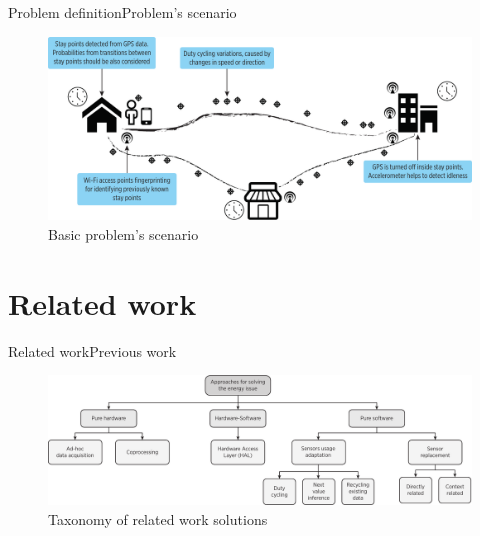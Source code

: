 \documentclass[10pt,xcolor={dvipsnames}]{beamer}
\begin{document}
\begin{frame}{Problem definition}{Problem's scenario}
\begin{figure}
  \centering
  \includegraphics[width=\textwidth]{vectors/scenario}
  \caption{Basic problem's scenario}
  \label{fig:scenario}
\end{figure}
\end{frame}

\section{Related work}
\begin{frame}{Related work}{Previous work}
\begin{figure}
  \centering
  \includegraphics[width=\textwidth]{../../../resources/images/vectors/approaches-taxonomy}
  \caption{Taxonomy of related work solutions}
  \label{fig:taxonomy}
\end{figure}
\end{frame}
\end{document}
